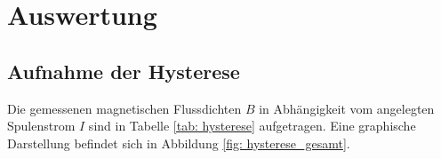 \section{Auswertung}
\subsection{Aufnahme der Hysterese}
Die gemessenen magnetischen Flussdichten $B$ in Abhängigkeit vom angelegten Spulenstrom $I$
sind in Tabelle \ref{tab: hysterese} aufgetragen. Eine graphische Darstellung befindet sich in Abbildung
\ref{fig: hysterese_gesamt}.


